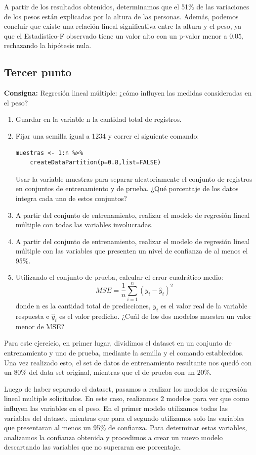 \documentclass{article} %
\begin{document}
A partir de los resultados obtenidos, determinamos que el 51\% de las variaciones de los pesos están explicadas por la altura de las personas. Además, podemos concluir que existe una relación lineal significativa entre la altura y el peso, ya que el Estadístico-F observado tiene un valor alto con un p-valor menor a $0.05$, rechazando la hipótesis nula.

\subsection{Tercer punto}

\textbf{Consigna:} Regresión lineal múltiple: ¿cómo influyen las medidas consideradas en el peso?

\begin{enumerate}[label=(\alph*)]
\item Guardar en la variable n la cantidad total de registros.
\item Fijar una semilla igual a 1234 y correr el siguiente comando:
\begin{lstlisting}
muestras <- 1:n %>%
	createDataPartition(p=0.8,list=FALSE)
\end{lstlisting}
Usar la variable muestras para separar aleatoriamente el conjunto de registros en conjuntos de entrenamiento y de prueba. ¿Qué porcentaje de los datos integra cada uno de estos conjuntos?
\item A partir del conjunto de entrenamiento, realizar el modelo de regresión lineal múltiple con todas las variables involucradas.
\item A partir del conjunto de entrenamiento, realizar el modelo de regresión lineal múltiple con las variables que presenten un nivel de confianza de al menos el 95\%.
\item Utilizando el conjunto de prueba, calcular el error cuadrático medio:
$$
MSE=\frac{1}{n}\sum^n_{i=1}(y_i-\hat{y}_i)^2
$$
donde n es la cantidad total de predicciones, $y_i$ es el valor real de la variable respuesta e $\hat{y}_i$ es el valor predicho. ¿Cuál de los dos modelos muestra un valor menor de MSE?
\end{enumerate}

Para este ejercicio, en primer lugar, dividimos el dataset en un conjunto de entrenamiento y uno de prueba, mediante la semilla y el comando establecidos. Una vez realizado esto, el set de datos de entrenamiento resultante nos quedó con un 80\%  del data set original, mientras que el de prueba con un 20\%.

Luego de haber separado el dataset, pasamos a realizar los modelos de regresión lineal multiple solicitados. En este caso, realizamos 2 modelos para ver que como influyen las variables en el peso. En el primer modelo utilizamos todas las variables del dataset, mientras que para el segundo utilizamos solo las variables que presentaran al menos un 95\% de confianza. Para determinar estas variables, analizamos la confianza obtenida y procedimos a crear un nuevo modelo descartando las variables que no superaran ese porcentaje.
\end{document}
